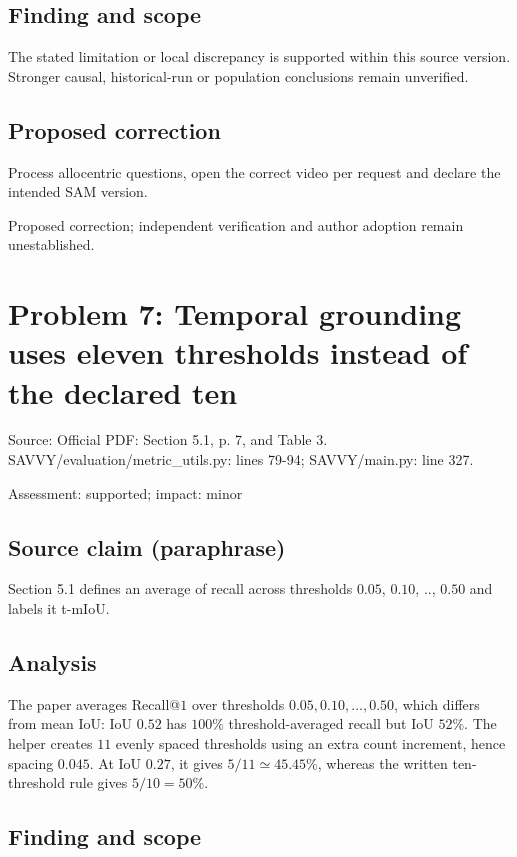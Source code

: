 \documentclass[11pt]{article}
\begin{document}
\subsection*{Finding and scope}

The stated limitation or local discrepancy is supported within this source version. Stronger causal, historical-run or population conclusions remain unverified.

\subsection*{Proposed correction}

Process allocentric questions, open the correct video per request and declare the intended SAM version.

Proposed correction; independent verification and author adoption remain unestablished.

\section*{Problem 7: Temporal grounding uses eleven thresholds instead of the declared ten}

Source: Official PDF: Section 5.1, p. 7, and Table 3. SAVVY/evaluation/metric\_utils.py: lines 79-94; SAVVY/main.py: line 327.

Assessment: supported; impact: minor

\subsection*{Source claim (paraphrase)}

Section 5.1 defines an average of recall across thresholds \(0.05\), \(0.10\), .., \(0.50\) and labels it t-mIoU.

\subsection*{Analysis}

The paper averages Recall@\(1\) over thresholds \(0.05,0.10,\ldots,0.50\), which differs from mean IoU: IoU \(0.52\) has \(100\%\) threshold-averaged recall but IoU \(52\%\). The helper creates \(11\) evenly spaced thresholds using an extra count increment, hence spacing \(0.045\). At IoU \(0.27\), it gives \(5/11\simeq45.45\%\), whereas the written ten-threshold rule gives \(5/10=50\%\).

\subsection*{Finding and scope}
\end{document}
